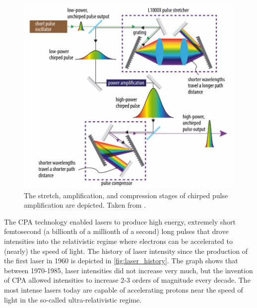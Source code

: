 \begin{figure}
	\centering
	\includegraphics[width=0.9\linewidth]{planning/images/cpa.PNG}
	\caption{The stretch, amplification, and compression stages of chirped pulse amplification are depicted. Taken from \cite{Arrigoni_2019_Photonics}.}
	\label{fig:cpa}
\end{figure}
The \gls{CPA} technology enabled lasers to produce high energy, extremely short femtosecond (a billionth of a millionth of a second) long pulses that drove intensities into the relativistic regime where electrons can be accelerated to (nearly) the speed of light. The history of laser intensity since the production of the first laser in 1960 is depicted in \autoref{fig:laser_history}. The graph shows that between 1970-1985, laser intensities did not increase very much, but the invention of \gls{CPA} allowed intensities to increase 2-3 orders of magnitude every decade. The most intense lasers today are capable of accelerating protons near the speed of light in the so-called ultra-relativistic regime.

